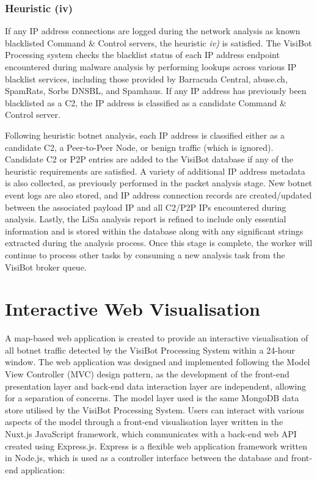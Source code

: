 \subsubsection{Heuristic (iv)} If any IP address connections are logged during the network analysis as known blacklisted Command \& Control servers, the heuristic \textit{iv)} is satisfied. The VisiBot Processing system checks the blacklist status of each IP address endpoint encountered during malware analysis by performing lookups across various IP blacklist services, including those provided by Barracuda Central, abuse.ch, SpamRats, Sorbs DNSBL, and Spamhaus. \cite{BarracudaCentral, AbuseCh, Spamrats, SorbsDnsbl, SpamhausZen} If any IP address has previously been blacklisted as a C2,  the IP address is classified as a candidate Command \& Control server.

Following heuristic botnet analysis, each IP address is classified either as a candidate C2, a Peer-to-Peer Node, or benign traffic (which is ignored). Candidate C2 or P2P entries are added to the VisiBot database if any of the heuristic requirements are satisfied. A variety of additional IP address metadata is also collected, as previously performed in the packet analysis stage. New botnet event logs are also stored, and IP address connection records are created/updated between the associated payload IP and all C2/P2P IPs encountered during analysis. Lastly, the LiSa analysis report is refined to include only essential information and is stored within the database along with any significant strings extracted during the analysis process. Once this stage is complete, the worker will continue to process other tasks by consuming a new analysis task from the VisiBot broker queue.



\section{Interactive Web Visualisation}

A map-based web application is created to provide an interactive visualisation of all botnet traffic detected by the VisiBot Processing System within a 24-hour window. The web application was designed and implemented following the Model View Controller (MVC) design pattern, as the development of the front-end presentation layer and back-end data interaction layer are independent, allowing for a separation of concerns. The model layer used is the same MongoDB data store \citep{MongoDB} utilised by the VisiBot Processing System. Users can interact with various aspects of the model through a front-end visualisation layer written in the Nuxt.js \cite{NuxtJS} JavaScript framework, which communicates with a back-end web API created using Express.js. \citep{ExpressJS} Express is a flexible web application framework written in Node.js, \citep{NodeJS} which is used as a controller interface between the database and front-end application:

